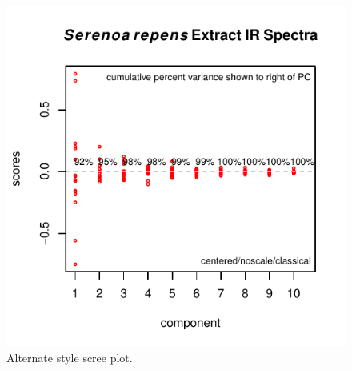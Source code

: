 \documentclass[letter,10pt,twocolumn,twoside,printwatermark=false]{pinp}
\begin{document}
\begin{figure}

{\centering \includegraphics{ChemoSpec2_files/figure-latex/Chunk24a-1} 

}

\caption{\label{scree2}Alternate style scree plot.}\label{fig:Chunk24a}
\end{figure}

\begin{Shaded}
\begin{Highlighting}[]
\StringTok{ }
   \NormalTok{)}
\end{Highlighting}
\end{Shaded}
\end{document}
